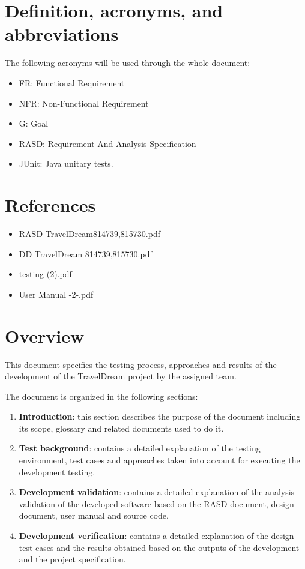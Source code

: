 \documentclass[a4paper,12pt]{book}
\begin{document}
\section{Definition, acronyms, and abbreviations}
The following acronyms will be used through the whole document:
\begin{itemize}
  \item FR: Functional Requirement
  \item NFR: Non-Functional Requirement
  \item G: Goal
  \item RASD: Requirement And Analysis Specification
  \item JUnit: Java unitary tests.
\end{itemize}

\section{References}
\begin{itemize}
  \item RASD TravelDream814739,815730.pdf
  \item DD TravelDream 814739,815730.pdf
  \item testing (2).pdf
  \item User Manual -2-.pdf
\end{itemize}

\section{Overview}
This document specifies the testing process, approaches and results of the development of the TravelDream project by the assigned team.\newline

The document is organized in the following sections:
\begin{enumerate}
  \item \textbf{Introduction}: this section describes the purpose of the document including its scope, glossary and related documents used to do it.
  \item \textbf{Test background}: contains a detailed explanation of the testing environment, test cases and approaches taken into account for executing the development testing.
  \item \textbf{Development validation}: contains a detailed explanation of the analysis validation of the developed software based on the RASD document, design document, user manual and source code.
  \item \textbf{Development verification}: contains a detailed explanation of the design test cases and the results obtained based on the outputs of the development and the project specification.
\end{enumerate}
\end{document}

